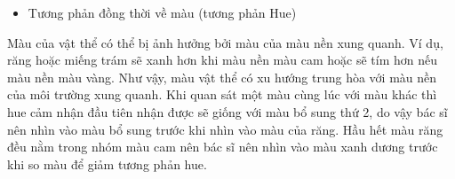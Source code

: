 \begin{itemize}
    \item{Tương phản đồng thời về màu (tương phản Hue)}
\end{itemize}
\vspace{-5pt}
\qquad Màu của vật thể có thể bị ảnh hưởng bởi màu của màu nền xung quanh. Ví dụ, răng hoặc miếng trám sẽ xanh hơn khi màu nền màu cam hoặc sẽ tím hơn nếu màu nền màu vàng. Như vậy, màu vật thể có xu hướng trung hòa với màu nền của môi trường xung quanh. Khi quan sát một màu cùng lúc với màu khác thì hue cảm nhận đầu tiên nhận được sẽ giống với màu bổ sung thứ 2, do vậy bác sĩ nên nhìn vào màu bổ sung trước khi nhìn vào màu của răng. Hầu hết màu răng đều nằm trong nhóm màu cam nên bác sĩ nên nhìn vào màu xanh dương trước khi so màu để giảm tương phản hue.\cite{TruongDinhKhoi}
\vspace{-5pt}


